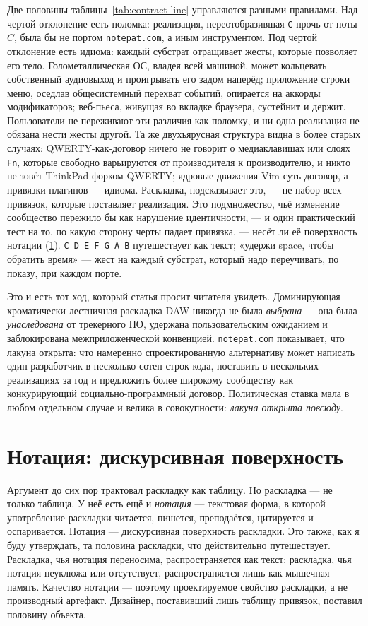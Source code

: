 \documentclass[10pt,letterpaper,twocolumn]{article}
\begin{document}
Две половины таблицы~\ref{tab:contract-line} управляются разными правилами. Над чертой отклонение есть поломка: реализация, переотобразившая \texttt{C} прочь от ноты $C$, была бы не портом \texttt{notepat.com}, а иным инструментом. Под чертой отклонение есть идиома: каждый субстрат отращивает жесты, которые позволяет его тело. Голометаллическая ОС, владея всей машиной, может кольцевать собственный аудиовыход и проигрывать его задом наперёд; приложение строки меню, оседлав общесистемный перехват событий, опирается на аккорды модификаторов; веб-пьеса, живущая во вкладке браузера, сустейнит и держит. Пользователи не переживают эти различия как поломку, и ни одна реализация не обязана нести жесты другой. Та же двухъярусная структура видна в более старых случаях: QWERTY-как-договор ничего не говорит о медиаклавишах или слоях \texttt{Fn}, которые свободно варьируются от производителя к производителю, и никто не зовёт ThinkPad форком QWERTY; ядровые движения Vim суть договор, а привязки плагинов --- идиома. Раскладка, подсказывает это, --- не набор всех привязок, которые поставляет реализация. Это подмножество, чьё изменение сообщество пережило бы как нарушение идентичности, --- и один практический тест на то, по какую сторону черты падает привязка, --- несёт ли её поверхность нотации (\textsection\ref{sec:notation}). \texttt{C D E F G A B} путешествует как текст; «удержи space, чтобы обратить время» --- жест на каждый субстрат, который надо переучивать, по показу, при каждом порте.

Это и есть тот ход, который статья просит читателя увидеть. Доминирующая хроматически-лестничная раскладка DAW никогда не была \emph{выбрана} --- она была \emph{унаследована} от трекерного ПО, удержана пользовательским ожиданием и заблокирована межприложенческой конвенцией. \texttt{notepat.com} показывает, что лакуна открыта: что намеренно спроектированную альтернативу может написать один разработчик в несколько сотен строк кода, поставить в нескольких реализациях за год и предложить более широкому сообществу как конкурирующий социально-программный договор. Политическая ставка мала в любом отдельном случае и велика в совокупности: \emph{лакуна открыта повсюду}.

\section{Нотация: дискурсивная поверхность}
\label{sec:notation}

Аргумент до сих пор трактовал раскладку как таблицу. Но раскладка --- не только таблица. У неё есть ещё и \emph{нотация} --- текстовая форма, в которой употребление раскладки читается, пишется, преподаётся, цитируется и оспаривается. Нотация --- дискурсивная поверхность раскладки. Это также, как я буду утверждать, та половина раскладки, что действительно путешествует. Раскладка, чья нотация переносима, распространяется как текст; раскладка, чья нотация неуклюжа или отсутствует, распространяется лишь как мышечная память. Качество нотации --- поэтому проектируемое свойство раскладки, а не производный артефакт. Дизайнер, поставивший лишь таблицу привязок, поставил половину объекта.
\end{document}
